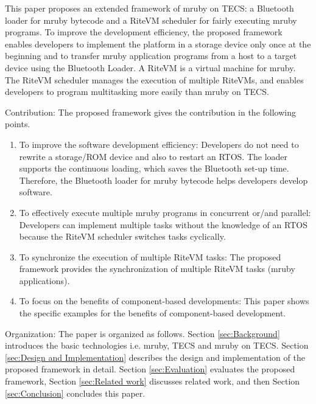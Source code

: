 \documentclass{sig-alternate-05-2015}
\begin{document}
This paper proposes an extended framework of mruby on TECS: a Bluetooth loader for mruby bytecode and a RiteVM scheduler for fairly executing mruby programs.
To improve the development efficiency, the proposed framework enables developers to implement the platform in a storage device only once at the beginning and to transfer mruby application programs from a host to a target device using the Bluetooth Loader.
A RiteVM is a virtual machine for mruby.
The RiteVM scheduler manages the execution of multiple RiteVMs, and enables developers to program multitasking more easily than mruby on TECS.

{\mybf Contribution}: The proposed framework gives the contribution in the following points.
\begin{enumerate}
\item {\mybf To improve the software development efficiency:} Developers do not need to rewrite a storage/ROM device and also to restart an RTOS.
The loader supports the continuous loading, which saves the Bluetooth set-up time.
Therefore, the Bluetooth loader for mruby bytecode helps developers develop software.
\item {\mybf To effectively execute multiple mruby programs in concurrent or/and parallel:} Developers can implement multiple tasks without the knowledge of an RTOS because the RiteVM scheduler switches tasks cyclically.
\item {\mybf To synchronize the execution of multiple RiteVM tasks:} The proposed framework provides the synchronization of multiple RiteVM tasks (mruby applications).
\item {\mybf To focus on the benefits of component-based developments:} This paper shows the specific examples for the benefits of component-based development. 
\end{enumerate}

{\mybf Organization}: The paper is organized as follows.
Section \ref{sec:Background} introduces the basic technologies i.e. mruby, TECS and mruby on TECS.
Section \ref{sec:Design and Implementation} describes the design and implementation of the proposed framework in detail.
Section \ref{sec:Evaluation} evaluates the proposed framework, Section \ref{sec:Related work} discusses related work, and then Section \ref{sec:Conclusion} concludes this paper.
\end{document}
